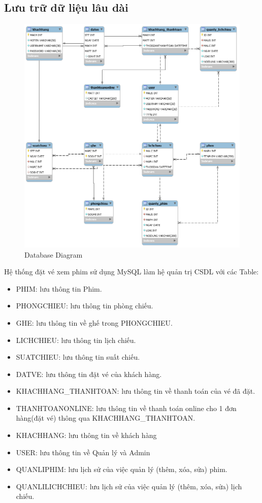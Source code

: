 \documentclass[a4paper, 12pt]{article}
\begin{document}
\subsection{Lưu trữ dữ liệu lâu dài}
\begin{figure}[H]
	\begin{center}
		\includegraphics[scale = 0.5]{image/4.4.png}
		\caption{Database Diagram}
	\end{center}
\end{figure}

Hệ thống đặt vé xem phim sử dụng MySQL làm hệ quản trị CSDL với các Table:
\begin{itemize}
	\item PHIM: lưu thông tin Phim.
	\item PHONGCHIEU: lưu thông tin phòng chiếu.
	\item GHE: lưu thông tin về ghế trong PHONGCHIEU.
	\item LICHCHIEU: lưu thông tin lịch chiếu.
	\item SUATCHIEU: lưu thông tin suất chiếu.
	\item DATVE: lưu thông tin đặt vé của khách hàng.
	\item KHACHHANG\_THANHTOAN: lưu thông tin về thanh toán của vé đã đặt.
	\item THANHTOANONLINE: lưu thông tin về thanh toán online cho 1 đơn hàng(đặt vé) thông qua KHACHHANG\_THANHTOAN.
	\item KHACHHANG: lưu thông tin về khách hàng
	\item USER: lưu thông tin về Quản lý và Admin
	\item QUANLIPHIM: lưu lịch sử của việc quản lý (thêm, xóa, sửa) phim.
	\item QUANLILICHCHIEU: lưu lịch sử của việc quản lý (thêm, xóa, sửa) lịch chiếu.
\end{itemize}	
\end{document}
